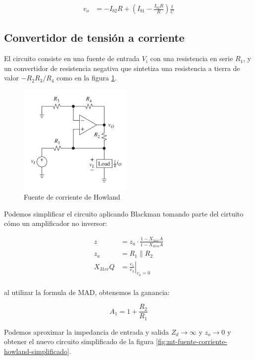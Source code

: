 \begin{align*}
v_o &= -I_{b2}R + \left( I_{b1} - \frac{I_{b2}R}{R} \right) \frac{t}{C}
\end{align*}

\subsection{Convertidor de tensión a corriente}

El circuito consiste en una fuente de entrada $V_i$ con una resistencia en serie $R_1$, y un convertidor de resistencia negativa que sintetiza una resistencia a tierra de valor $-R_2 R_3 / R_4$ como en la figura \ref{fig:mt-fuente-corriente-howland}.

\begin{figure}
    \centering
    \includegraphics[width=0.5\textwidth]{src/images/fuente-corriente-howland.png}
    \caption{Fuente de corriente de Howland}
    \label{fig:mt-fuente-corriente-howland}
\end{figure}

Podemos simplificar el circuito aplicando Blackman tomando parte del cirtuito cómo un amplificador no inversor:

\begin{align*}
    z & = z_a \cdot \frac{1 - X_{3icc}A}{1 - X_{3ica}A} \\
    z_a & = R_1 \parallel R_2 \\
    X_{31cc} Q& = \left. \frac{e_1}{e_3} \right|_{v_a=0} \\
\end{align*}

al utilizar la formula de MAD, obtenemos la ganancia:

\begin{equation}
    A_1 = 1 + \frac{R_2}{R_1}
\end{equation}

Podemos aproximar la impedancia de entrada y salida $Z_d \rightarrow \infty $ y $z_o \rightarrow 0$ y obtener el nuevo circuito simplificado de la figura \ref{fig:mt-fuente-corriente-howland-simplificado}.

